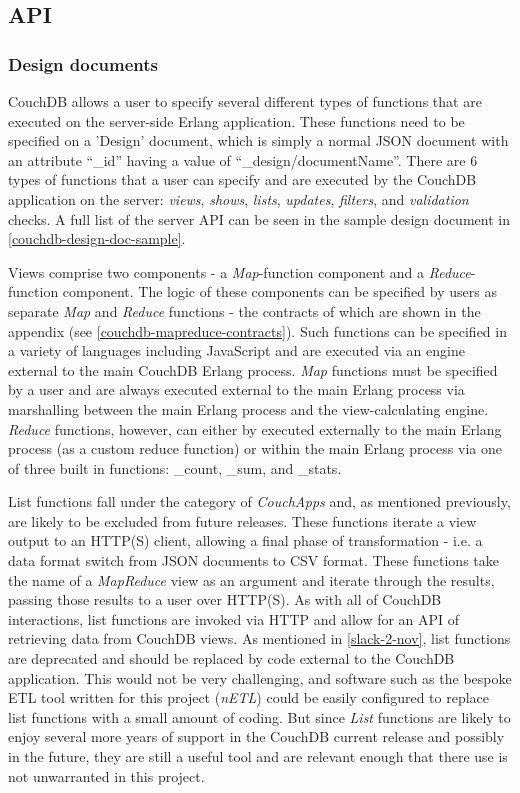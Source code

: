 \subsection{API}
\subsubsection{Design documents}
CouchDB allows a user to specify several different types of functions that are executed on the server-side Erlang application. These functions need to be specified on a 'Design' document, which is simply a normal JSON document with an attribute ``\_id'' having a value of ``\_design/documentName''. There are 6 types of functions that a user can specify and are executed by the CouchDB application on the server: \textit{views}, \textit{shows}, \textit{lists}, \textit{updates}, \textit{filters}, and \textit{validation} checks. A full list of the server API can be seen in the sample design document in \ref{couchdb-design-doc-sample}.

Views comprise two components - a \textit{Map}-function component and a \textit{Reduce}-function component. The logic of these components can be specified by users as separate \textit{Map} and \textit{Reduce} functions - the contracts of which are shown in the appendix (see \ref{couchdb-mapreduce-contracts}). Such functions can be specified in a variety of languages including JavaScript and are executed via an engine external to the main CouchDB Erlang process. \textit{Map} functions must be specified by a user and are always executed external to the main Erlang process via marshalling between the main Erlang process and the view-calculating engine. \textit{Reduce} functions, however, can either by executed externally to the main Erlang process (as a custom reduce function) or within the main Erlang process via one of three built in functions: \_count, \_sum, and \_stats.

List functions fall under the category of \textit{CouchApps} and, as mentioned previously, are likely to be excluded from future releases. These functions iterate a view output to an HTTP(S) client, allowing a final phase of transformation - i.e. a data format switch from JSON documents to CSV format. These  functions take the name of a \textit{MapReduce} view as an argument and iterate through the results, passing those results to a user over HTTP(S). As with all of CouchDB interactions, list functions are invoked via HTTP and allow for an API of retrieving data from CouchDB views. As mentioned in \ref{slack-2-nov}, list functions are deprecated and should be replaced by code external to the CouchDB application. This would not be very challenging, and software such as the bespoke ETL tool written for this project (\textit{nETL}) could be easily configured to replace list functions with a small amount of coding. But since \textit{List} functions are likely to enjoy several more years of support in the CouchDB current release and possibly in the future, they are still a useful tool and are relevant enough that there use is not unwarranted in this project.

